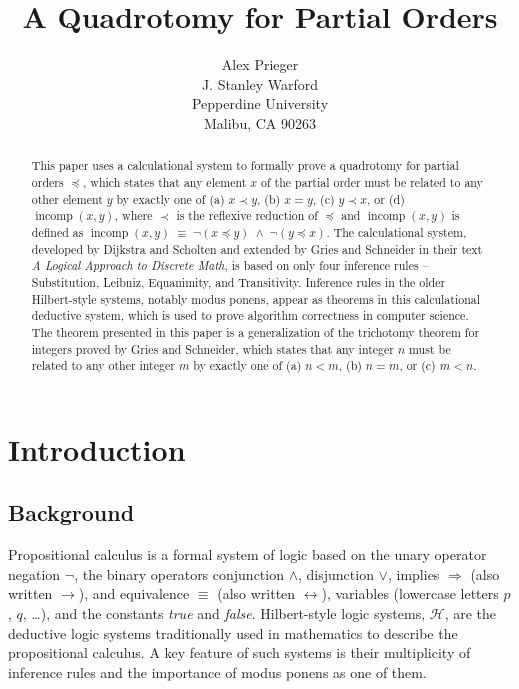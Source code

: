 \documentclass[12pt, fleqn, leqno]{article}
\title{A Quadrotomy for Partial Orders}
\author{
   Alex Prieger\\
   J. Stanley Warford\\
   Pepperdine University\\
   Malibu, CA 90263}
\date{} %
\newcommand{\equivs}{\ensuremath{\;\equiv\;}}       %
\newcommand{\lands}{\ensuremath{\;\land\;}}         %
\newcommand{\impl}{\ensuremath{\Rightarrow}}        %
\DeclareMathOperator{\incomp}{incomp}
\begin{document}
\maketitle
\begin{abstract}

This paper uses a calculational system to formally prove a quadrotomy for partial orders $\preceq$, which states that any element $x$ of the partial order must be related to any other element $y$ by exactly one of (a) $x \prec y$, (b) $x=y$, (c) $y\prec x$, or (d) $\incomp(x,y)$, where $\prec$ is the reflexive reduction of $\preceq$ and $\incomp(x,y)$ is defined as $\incomp(x,y) \equivs \neg (x\preceq y) \lands \neg (y\preceq x)$.
The calculational system, developed by Dijkstra and Scholten and extended by Gries and Schneider in their text \textit{A Logical Approach to Discrete Math}, is based on only four inference rules -- Substitution, Leibniz, Equanimity, and Transitivity. 
Inference rules in the older Hilbert-style systems, notably modus ponens, appear as theorems in this calculational deductive system, which is used to prove algorithm correctness in computer science.
The theorem presented in this paper is a generalization of the trichotomy theorem for integers proved by Gries and Schneider, which states that any integer $n$ must be related to any other integer $m$ by exactly one of (a) $n<m$, (b) $n=m$, or (c) $m<n$.

\end{abstract}

\thispagestyle{plain}

\section{Introduction}

\subsection{Background}

Propositional calculus is a formal system of logic based on the unary operator negation $\neg$,
the binary operators conjunction $\land$, disjunction $\lor$, implies $\impl$ (also written $\rightarrow$),
and equivalence $\equiv$ (also written $\leftrightarrow$),
variables (lowercase letters $p$, $q$, \dots), and the constants \textit{true} and \textit{false}.
Hilbert-style logic systems, $\mathcal{H}$, are the deductive logic systems traditionally used in mathematics to describe the propositional calculus.
A key feature of such systems is their multiplicity of inference rules and the importance of modus ponens as one of them.
\end{document}
